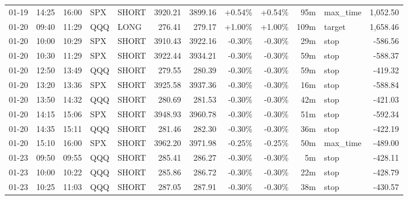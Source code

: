 \documentclass[11pt,a4paper,twoside]{article}
\begin{document}
\begin{center}
\begin{longtable}{>{\color{txtmain}}l l l l l r r r r r >{\color{txtmain}}l r}
01-19 & 14:25 & 16:00 & SPX & SHORT & 3920.21 & 3899.16 & \textcolor{wingreen}{+0.54\%} & \textcolor{wingreen}{+0.54\%} & 95m & max\_time & \textcolor{wingreen}{1,052.50} \\
01-20 & 09:40 & 11:29 & QQQ & LONG & 276.41 & 279.17 & \textcolor{wingreen}{+1.00\%} & \textcolor{wingreen}{+1.00\%} & 109m & target & \textcolor{wingreen}{1,658.46} \\
01-20 & 10:00 & 10:29 & SPX & SHORT & 3910.43 & 3922.16 & \textcolor{lossred}{-0.30\%} & \textcolor{lossred}{-0.30\%} & 29m & stop & \textcolor{lossred}{-586.56} \\
01-20 & 10:30 & 11:29 & SPX & SHORT & 3922.44 & 3934.21 & \textcolor{lossred}{-0.30\%} & \textcolor{lossred}{-0.30\%} & 59m & stop & \textcolor{lossred}{-588.37} \\
01-20 & 12:50 & 13:49 & QQQ & SHORT & 279.55 & 280.39 & \textcolor{lossred}{-0.30\%} & \textcolor{lossred}{-0.30\%} & 59m & stop & \textcolor{lossred}{-419.32} \\
01-20 & 13:20 & 13:36 & SPX & SHORT & 3925.58 & 3937.36 & \textcolor{lossred}{-0.30\%} & \textcolor{lossred}{-0.30\%} & 16m & stop & \textcolor{lossred}{-588.84} \\
01-20 & 13:50 & 14:32 & QQQ & SHORT & 280.69 & 281.53 & \textcolor{lossred}{-0.30\%} & \textcolor{lossred}{-0.30\%} & 42m & stop & \textcolor{lossred}{-421.03} \\
01-20 & 14:15 & 15:06 & SPX & SHORT & 3948.93 & 3960.78 & \textcolor{lossred}{-0.30\%} & \textcolor{lossred}{-0.30\%} & 51m & stop & \textcolor{lossred}{-592.34} \\
01-20 & 14:35 & 15:11 & QQQ & SHORT & 281.46 & 282.30 & \textcolor{lossred}{-0.30\%} & \textcolor{lossred}{-0.30\%} & 36m & stop & \textcolor{lossred}{-422.19} \\
01-20 & 15:10 & 16:00 & SPX & SHORT & 3962.20 & 3971.98 & \textcolor{lossred}{-0.25\%} & \textcolor{lossred}{-0.25\%} & 50m & max\_time & \textcolor{lossred}{-489.00} \\
01-23 & 09:50 & 09:55 & QQQ & SHORT & 285.41 & 286.27 & \textcolor{lossred}{-0.30\%} & \textcolor{lossred}{-0.30\%} & 5m & stop & \textcolor{lossred}{-428.11} \\
01-23 & 10:00 & 10:22 & QQQ & SHORT & 285.86 & 286.72 & \textcolor{lossred}{-0.30\%} & \textcolor{lossred}{-0.30\%} & 22m & stop & \textcolor{lossred}{-428.79} \\
01-23 & 10:25 & 11:03 & QQQ & SHORT & 287.05 & 287.91 & \textcolor{lossred}{-0.30\%} & \textcolor{lossred}{-0.30\%} & 38m & stop & \textcolor{lossred}{-430.57} \\

\end{longtable}
\end{center}
\end{document}
